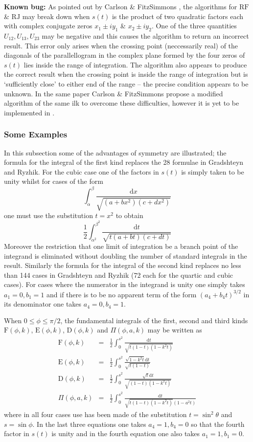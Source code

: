 \textbf{Known bug:} As pointed out by Carlson \& FitzSimmons \cite{CarlsonFitzSimmons:00},
the algorithms for $\mathrm{RF}$ \& $\mathrm{RJ}$ may break down when $s(t)$ is the product
of two quadratic factors each with complex conjugate zeros $x_1\pm i y_1$ \&
$x_2\pm i y_2$. One of the three quantities
$U_{12}, U_{13}, U_{23}$ may be negative and this causes the algorithm to return an
incorrect result. This error only arises when the crossing point (neccessarily real) of
the diagonals of the parallellogram in the complex plane formed by the four zeros of
$s(t)$  lies inside the range of integration. The algorithm also appears to produce the
correct result when the crossing point is inside the range of integration but is
`sufficiently close' to either end of the range -- the precise condition appears to be
unknown.
In the same paper Carlson \& FitzSimmons propose a modified algorithm of the same ilk
to overcome these difficulties, however it is yet to be implemented in \REDUCE.

\subsubsection{Some Examples}
In this subsection some of the advantages of symmetry are illustrated; the formula for the
integral of the first kind replaces the 28 formulae in Gradshteyn and Ryzhik. For the cubic
case one of the factors in $s(t)$ is simply taken to be unity whilst for cases of the form
\[\int_\alpha^\beta \frac{\mathrm{d}x}{\sqrt{(a+b x^2)(c+d x^2)}}\]
one must use the substitution $t=x^2$ to obtain
\[\frac{1}{2}\int_{\alpha^2}^{\beta^2} \frac{\mathrm{d}t}{\sqrt{t(a+b t)(c+d t)}}\]
Moreover the restriction that one limit of integration be a branch point of the integrand is
eliminated without doubling the number of standard integrals in the result.
Similarly the formula for the integral of the second kind replaces no less than 144 cases
in Gradshteyn and Ryzhik (72 each for the quartic and cubic cases). For cases where the
numerator in the integrand is unity one simply takes $a_1=0, b_1=1$ and if there is to be no
apparent term of the form $(a_4+b_4t)^{3/2}$ in its denominator one takes $a_4=0, b_4=1$.

When $0 \leq \phi \leq \pi/2$, the fundamental integrals of the first, second
and third kinds $\mathrm{F}(\phi,k)$, $\mathrm{E}(\phi,k)$, $\mathrm{D}(\phi,k)$
and $\Pi(\phi,a,k)$ may be written as
\begin{eqnarray*}
\mathrm{F}(\phi,k) &=& \frac{1}{2}\int_0^{s^2} \frac{\mathrm{d}t}{\sqrt{t(1-t)(1-k^2t)}}\\
\mathrm{E}(\phi,k) &=& \frac{1}{2}\int_0^{s^2} \frac{\sqrt{1-k^2t}\mathrm{d}t}{\sqrt{t(1-t)}}\\
\mathrm{D}(\phi,k) &=& \frac{1}{2}\int_0^{s^2} \frac{\sqrt{t}\mathrm{d}t}{\sqrt{(1-t)(1-k^2t)}}\\
\Pi(\phi,a,k) &=& \frac{1}{2}\int_0^{s^2} \frac{\mathrm{d}t}{\sqrt{t(1-t)(1-k^2t)}(1-a^2t)}
\end{eqnarray*}
where in all four cases use has been made of the substitution $t=\sin^2 \theta$
and $s=\sin\phi$. In the last three equations one takes $a_4=1, b_4 =0$ so that
the fourth factor in $s(t)$ is unity and in the fourth equation one also takes
$a_1=1,b_1=0$.

